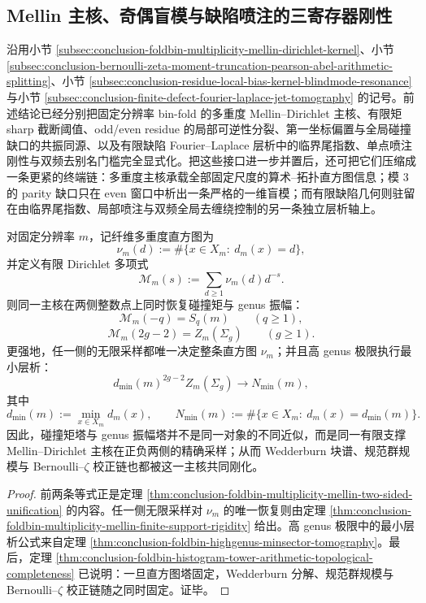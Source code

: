 \subsection{Mellin 主核、奇偶盲模与缺陷喷注的三寄存器刚性}\label{subsec:conclusion-mellin-parity-defect-jet-bifrequency-rigidity}
沿用小节 \ref{subsec:conclusion-foldbin-multiplicity-mellin-dirichlet-kernel}、小节 \ref{subsec:conclusion-bernoulli-zeta-moment-truncation-pearson-abel-arithmetic-splitting}、小节 \ref{subsec:conclusion-residue-local-bias-kernel-blindmode-resonance} 与小节 \ref{subsec:conclusion-finite-defect-fourier-laplace-jet-tomography} 的记号。前述结论已经分别把固定分辨率 bin-fold 的多重度 Mellin--Dirichlet 主核、有限矩 sharp 截断阈值、odd/even residue 的局部可逆性分裂、第一坐标偏置与全局碰撞缺口的共振同源、以及有限缺陷 Fourier--Laplace 层析中的临界尾指数、单点喷注刚性与双频去别名门槛完全显式化。把这些接口进一步并置后，还可把它们压缩成一条更紧的终端链：多重度主核承载全部固定尺度的算术--拓扑直方图信息；模 \(3\) 的 parity 缺口只在 even 窗口中析出一条严格的一维盲模；而有限缺陷几何则驻留在由临界尾指数、局部喷注与双频全局去缠绕控制的另一条独立层析轴上。

\begin{theorem}\label{thm:conclusion-mellin-master-kernel-two-sided-completeness}
对固定分辨率 \(m\)，记纤维多重度直方图为
\[
\nu_m(d):=\#\{x\in X_m:\ d_m(x)=d\},
\]
并定义有限 Dirichlet 多项式
\[
\mathcal M_m(s):=\sum_{d\ge 1}\nu_m(d)d^{-s}.
\]
则同一主核在两侧整数点上同时恢复碰撞矩与 genus 振幅：
\[
\mathcal M_m(-q)=S_q(m)\qquad(q\ge 1),
\]
\[
\mathcal M_m(2g-2)=Z_m(\Sigma_g)\qquad(g\ge 1).
\]
更强地，任一侧的无限采样都唯一决定整条直方图 \(\nu_m\)；并且高 genus 极限执行最小层析：
\[
d_{\min}(m)^{2g-2}Z_m(\Sigma_g)\longrightarrow N_{\min}(m),
\]
其中
\[
d_{\min}(m):=\min_{x\in X_m}d_m(x),
\qquad
N_{\min}(m):=\#\{x\in X_m:\ d_m(x)=d_{\min}(m)\}.
\]
因此，碰撞矩塔与 genus 振幅塔并不是同一对象的不同近似，而是同一有限支撑 Mellin--Dirichlet 主核在正负两侧的精确采样；从而 Wedderburn 块谱、规范群规模与 Bernoulli--\(\zeta\) 校正链也都被这一主核共同刚化。
\end{theorem}
\begin{proof}
前两条等式正是定理 \ref{thm:conclusion-foldbin-multiplicity-mellin-two-sided-unification} 的内容。任一侧无限采样对 \(\nu_m\) 的唯一恢复则由定理 \ref{thm:conclusion-foldbin-multiplicity-mellin-finite-support-rigidity} 给出。高 genus 极限中的最小层析公式来自定理 \ref{thm:conclusion-foldbin-highgenus-minsector-tomography}。最后，定理 \ref{thm:conclusion-foldbin-histogram-tower-arithmetic-topological-completeness} 已说明：一旦直方图塔固定，Wedderburn 分解、规范群规模与 Bernoulli--\(\zeta\) 校正链随之同时固定。证毕。
\end{proof}

